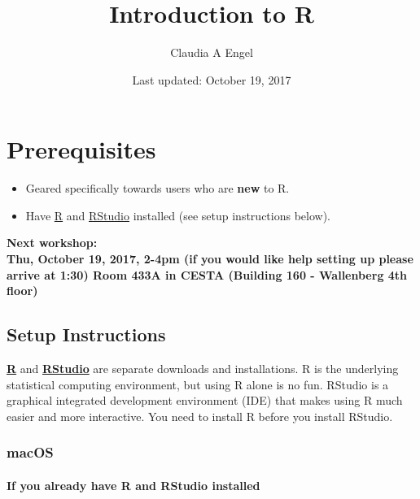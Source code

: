\documentclass[]{book}
\title{Introduction to R}
\author{Claudia A Engel}
\date{Last updated: October 19, 2017}
\providecommand{\tightlist}{%
  \setlength{\itemsep}{0pt}\setlength{\parskip}{0pt}}
\theoremstyle{definition}
\theoremstyle{definition}
\theoremstyle{remark}
\begin{document}
\maketitle

{
\setcounter{tocdepth}{1}
\tableofcontents
}
\chapter*{Prerequisites}\label{prerequisites}

\begin{itemize}
\tightlist
\item
  Geared specifically towards users who are \textbf{new} to R.\\
\item
  Have \href{https://cran.r-project.org/}{R} and
  \href{https://www.rstudio.com/}{RStudio} installed (see setup
  instructions below).
\end{itemize}

\textbf{Next workshop:\\
Thu, October 19, 2017, 2-4pm (if you would like help setting up please
arrive at 1:30) Room 433A in CESTA (Building 160 - Wallenberg 4th
floor)}

\section*{Setup Instructions}\label{setup-instructions}

\href{https://cran.r-project.org/}{\textbf{R}} and
\href{https://www.rstudio.com/}{\textbf{RStudio}} are separate downloads
and installations. R is the underlying statistical computing
environment, but using R alone is no fun. RStudio is a graphical
integrated development environment (IDE) that makes using R much easier
and more interactive. You need to install R before you install RStudio.

\subsection*{macOS}\label{macos}

\subsubsection*{If you already have R and RStudio
installed}\label{if-you-already-have-r-and-rstudio-installed}
\end{document}
